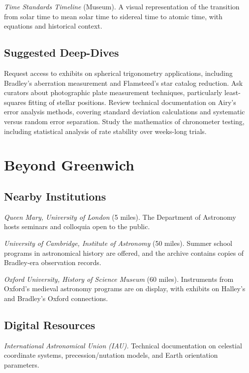 \textit{Time Standards Timeline} (Museum). A visual representation of the transition from solar time to mean solar time to sidereal time to atomic time, with equations and historical context.

\subsection*{Suggested Deep-Dives}

Request access to exhibits on spherical trigonometry applications, including Bradley's aberration measurement and Flamsteed's star catalog reduction. Ask curators about photographic plate measurement techniques, particularly least-squares fitting of stellar positions. Review technical documentation on Airy's error analysis methods, covering standard deviation calculations and systematic versus random error separation. Study the mathematics of chronometer testing, including statistical analysis of rate stability over weeks-long trials.

\section{Beyond Greenwich}

\subsection*{Nearby Institutions}

\textit{Queen Mary, University of London} (5 miles). The Department of Astronomy hosts seminars and colloquia open to the public.

\textit{University of Cambridge, Institute of Astronomy} (50 miles). Summer school programs in astronomical history are offered, and the archive contains copies of Bradley-era observation records.

\textit{Oxford University, History of Science Museum} (60 miles). Instruments from Oxford's medieval astronomy programs are on display, with exhibits on Halley's and Bradley's Oxford connections.

\subsection*{Digital Resources}

\textit{International Astronomical Union (IAU).} Technical documentation on celestial coordinate systems, precession/nutation models, and Earth orientation parameters.

